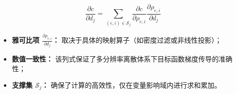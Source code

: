 \documentclass[notheorems]{beamer}
\begin{document}
\begin{frame}[t]
{\begin{tcolorbox}
				\vspace{0.6em}
				
				{\small
					\begin{equation*}
						\frac{\partial c}{\partial d_j} = {\sum_{(e,i) \in \mathcal{S}_j}} \frac{\partial c}{\partial \rho_{e,i}} {\frac{\partial \rho_{e,i}}{\partial d_j}}
				\end{equation*}}
				
				\vspace{0.4em}
				
				{\fontsize{9}{12}\selectfont\sffamily
					\begin{itemize}
						\item \textbf{雅可比项 $\frac{\partial \rho_{e,i}}{\partial d_j}$：} 取决于具体的映射算子（如密度过滤或非线性投影）；
						\item \textbf{数值一致性：} 该列式保证了多分辨率离散体系下目标函数梯度传导的准确性；
						\item \textbf{支撑集 $\mathcal{S}_j$：} 确保了计算的高效性，仅在变量影响域内进行求和累加。
				\end{itemize}}
			\end{tcolorbox}
		}
		
	\end{frame}
	
	
\end{document}
